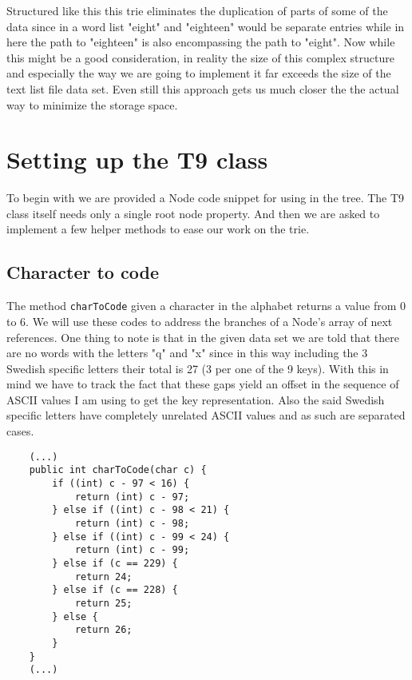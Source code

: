 \documentclass[a4paper,11pt]{article}
\begin{document}
Structured like this this trie eliminates the duplication of parts of some of the data since in a word list "eight" and "eighteen" would be separate entries while in here the path to "eighteen" is also encompassing the path to "eight". Now while this might be a good consideration, in reality the size of this complex structure and especially the way we are going to implement it far exceeds the size of the text list file data set. Even still this approach gets us much closer the the actual way to minimize the storage space.

\section*{Setting up the T9 class}

To begin with we are provided a Node code snippet for using in the tree. The T9 class itself needs only a single root node property. And then we are asked to implement a few helper methods to ease our work on the trie.

\subsection*{Character to code}

The method {\tt charToCode} given a character in the alphabet returns a value from 0 to 6.  We will use these codes to address the branches of a Node's array of next references. One thing to note is that in the given data set we are told that there are no words with the letters "q" and "x" since in this way including the 3 Swedish specific letters their total is 27 (3 per one of the 9 keys). With this in mind we have to track the fact that these gaps yield an offset in the sequence of ASCII values I am using to get the key representation. Also the said Swedish specific letters have completely unrelated ASCII values and as such are separated cases.

\begin{verbatim}
    (...)
    public int charToCode(char c) {
        if ((int) c - 97 < 16) {
            return (int) c - 97;
        } else if ((int) c - 98 < 21) {
            return (int) c - 98;
        } else if ((int) c - 99 < 24) {
            return (int) c - 99;
        } else if (c == 229) {
            return 24;
        } else if (c == 228) {
            return 25;
        } else {
            return 26;
        }
    }
    (...)
\end{verbatim}
\end{document}
